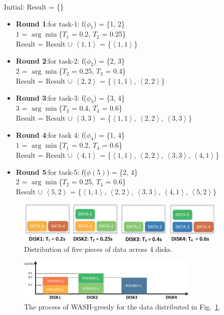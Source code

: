 \documentclass[conference]{IEEEtran}
\begin{document}
Initial: Result = \{\}
\begin{itemize}
	\item \textbf{Round 1}:for task-1:
	 f($\phi_1$) = \{1, 2\} \\
	 $1$ = $\arg\min$\{$T_1$ = 0.2, $T_2$ = 0.25\}\\
	Result = Result $\cup$ $\left \langle 1, 1\right \rangle$ = \{$\left \langle 1, 1\right \rangle$\}
	\item \textbf{Round 2}:for task-2:
	f($\phi_2$) = \{2, 3\}\\
	$2$ = $\arg\min$\{$T_2$ = 0.25, $T_3$ = 0.4\}\\
	Result = Result $\cup$ $\left \langle 2, 2\right \rangle$ = \{$\left \langle 1, 1\right \rangle$, $\left \langle 2, 2\right \rangle$\}
	\item \textbf{Round 3}:for task-3:
	f($\phi_3$) = \{3, 4\}\\
	$3$ = $\arg\min$\{$T_3$ = 0.4, $T_4$ = 0.6\}\\
	Result = Result $\cup$ $\left \langle 3, 3\right \rangle$ = \{$\left \langle 1, 1\right \rangle$, $\left \langle 2, 2\right \rangle$,  $\left \langle 3, 3\right \rangle$\}
	\item \textbf{Round 4}:for task  $4$:
	f($\phi_4$) = \{1, 4\}\\
	$1$ = $\arg\min$\{$T_1$ = 0.2, $T_4$ = 0.6\}\\
	Result = Result $\cup$ $\left \langle 4, 1\right \rangle$ = \{$\left \langle 1, 1\right \rangle$, $\left \langle 2, 2\right \rangle$,  $\left \langle 3, 3\right \rangle$, $\left \langle 4, 1\right \rangle$\}	
	\item \textbf{Round 5}:for task-5:
	f($\phi(5)$) = \{2, 4\}\\
	$2$ = $\arg\min$\{$T_2$ = 0.25, $T_4$ = 0.6\}\\
	Result $\cup$ $\left \langle 5, 2\right \rangle$ = \{$\left \langle 1, 1\right \rangle$, $\left \langle 2, 2\right \rangle$,  $\left \langle 3, 3\right \rangle$, $\left \langle 4, 1\right \rangle$, $\left \langle 5, 2\right \rangle$\}	
\end{itemize}

\begin{figure}[!t]
	\centering
	\includegraphics[height=0.8in]{fig1_10.eps}
	\caption{Distribution of five pieces of data across 4 disks.  }
	\label{fig1}
	\vspace{-0.4cm}
\end{figure}
\begin{figure}[!t]
	\centering
	\includegraphics[height=0.8in]{fig2_3.eps}
	\caption{The process of WASH-greedy for the data distributed in Fig.~\ref{fig1}. }
	\label{fig2}
	\vspace{-0.4cm}
\end{figure}
\end{document}
